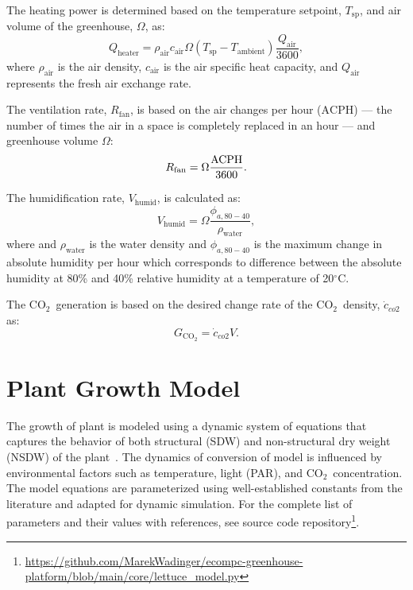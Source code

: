 \documentclass[conference]{IEEEtran}
\newcommand{\coo}{\ensuremath{\mathrm{CO_2}}}
\begin{document}
The heating power is determined based on the temperature setpoint, \( T_{\text{sp}} \), and air volume of the greenhouse, \( \Omega \), as:
\begin{equation}
    Q_{\text{heater}} = \rho_{\text{air}}  c_{\text{air}}  \Omega  (T_{\text{sp}} - T_{\text{ambient}})  \frac{Q_{\text{air}}}{3600},
\end{equation}
where \( \rho_{\text{air}} \) is the air density, \( c_{\text{air}} \) is the air specific heat capacity, and \( Q_{\text{air}} \) represents the fresh air exchange rate.

The ventilation rate, \( R_{\text{fan}} \), is based on the air changes per hour (\( \text{ACPH} \)) --- the number of times the air in a space is completely replaced in an hour --- and greenhouse volume \( \Omega \):
\begin{equation}
    R_{\text{fan}} = \Omega \frac{\text{\( \text{ACPH} \)}}{3600}.
\end{equation}

The humidification rate, \( V_{\text{humid}} \), is calculated as:
\begin{equation}
    V_{\text{humid}} = \Omega \frac{\phi_{a, 80 - 40}}{\rho_{\text{water}}},
\end{equation}
where and \( \rho_{\text{water}} \) is the water density and  \( \phi_{a, 80 - 40} \) is the maximum change in absolute humidity per hour which corresponds to difference between the absolute humidity at 80\% and 40\% relative humidity at a temperature of 20\( ^\circ \)C.

The \coo\ generation is based on the desired change rate of the \coo\ density, \( \dot{c}_{co2} \) as:
\begin{equation}
    G_{\coo} = \dot{c}_{co2}  V.
\end{equation}

\section{Plant Growth Model}\label{sec:lettuce_growth}
The growth of plant is modeled using a dynamic system of equations that captures the behavior of both structural (SDW) and non-structural dry weight (NSDW) of the plant~\cite{VANHENTEN199455}. The dynamics of conversion of  model is influenced by environmental factors such as temperature, light (PAR), and \coo\ concentration. The model equations are parameterized using well-established constants from the literature and adapted for dynamic simulation. For the complete list of parameters and their values with references, see source code repository\footnote{\url{https://github.com/MarekWadinger/ecompc-greenhouse-platform/blob/main/core/lettuce_model.py}}.
\end{document}
